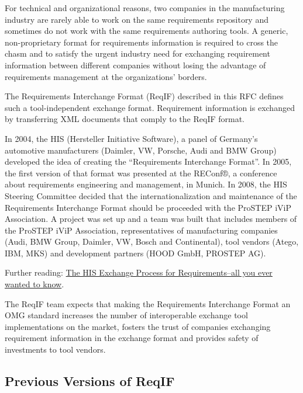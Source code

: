 For technical and organizational reasons, two companies in the manufacturing industry are rarely able to work on the same requirements repository and sometimes do not work with the same requirements authoring tools.  A generic, non-proprietary format for requirements information is required to cross the chasm and to satisfy the urgent industry need for exchanging requirement information between different companies without losing the advantage of requirements management at the organizations' borders.

The Requirements Interchange Format (ReqIF) described in this RFC defines such a tool-independent exchange format.  Requirement information is exchanged by transferring XML documents that comply to the ReqIF format.

In 2004, the HIS (Hersteller Initiative Software), a panel of Germany's automotive manufacturers (Daimler, VW, Porsche, Audi and BMW Group) developed the idea of creating the ``Requirements Interchange Format''.  In 2005, the first version of that format was presented at the REConf®, a conference about requirements engineering and management, in Munich.  In 2008, the HIS Steering Committee decided that the internationalization and maintenance of the Requirements Interchange Format should be proceeded with the ProSTEP iViP Association.  A project was set up and a team was built that includes members of the ProSTEP iViP Association, representatives of manufacturing companies (Audi, BMW  Group, Daimler, VW, Bosch and Continental), tool vendors (Atego, IBM, MKS) and development partners (HOOD GmbH, PROSTEP AG).

\begin{info}
Further reading: \href{http://formalmind.com/de/blog/his-exchange-process-requirements-all-you-ever-wanted-know}{The HIS Exchange Process for Requirements–all you ever wanted to know}.
\end{info}

The ReqIF team expects that making the Requirements Interchange Format an OMG standard increases the number of interoperable exchange tool implementations on the market, fosters the trust of companies exchanging requirement information in the exchange format and provides safety of investments to tool vendors.

\subsection{Previous Versions of ReqIF}
\label{sec:RIF}

